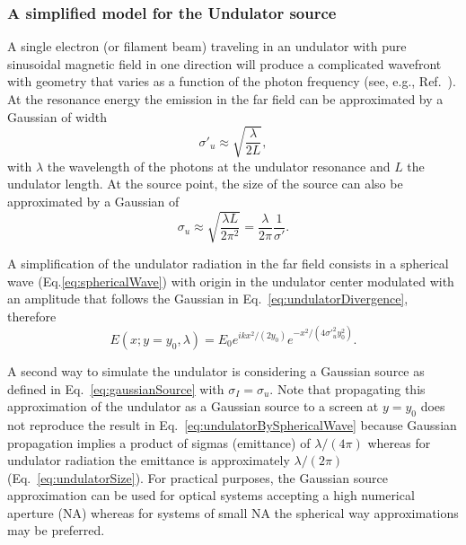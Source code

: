 \documentclass[preprint]{iucr}              %
\begin{document}
\subsubsection{A simplified model for the Undulator source}
\label{sec:undulator}

A single electron (or filament beam) traveling in an undulator with pure sinusoidal magnetic field in one direction will produce a complicated wavefront with geometry that varies as a function of the photon frequency (see, e.g., Ref.~\cite{elleaume}). At the resonance energy the emission in the far field can be approximated by a Gaussian of width \cite{elleaume}
\begin{equation}
\label{eq:undulatorDivergence}
    \sigma'_u \approx\sqrt{\frac{\lambda}{2 L}},
\end{equation}
with $\lambda$ the wavelength of the photons at the undulator resonance and $L$ the undulator length. At the source point, the size of the source can also be approximated by a Gaussian of
\begin{equation}
\label{eq:undulatorSize}
    \sigma_u \approx\sqrt{\frac{\lambda L}{2 \pi^2}} = \frac{\lambda}{2 \pi} \frac{1}{\sigma'}.
\end{equation}

A  simplification of the undulator radiation in the far field consists in a spherical wave (Eq.\ref{eq:sphericalWave}) with origin in the undulator center modulated with an amplitude that follows the Gaussian in Eq.~\ref{eq:undulatorDivergence}, therefore
\begin{equation}
    \label{eq:undulatorBySphericalWave}
    E(x;y=y_0,\lambda) = E_0 e^{i k x^2 / (2 y_0)} e^{-x^2/(4 \sigma'_u^2 y_0^2)}.
\end{equation}

A second way to simulate the undulator is considering a Gaussian source as defined in Eq.~\ref{eq:gaussianSource} with $\sigma_I=\sigma_u$. Note that propagating this approximation of the undulator as a Gaussian source to a screen at $y=y_0$ does not reproduce the result in Eq.~\ref{eq:undulatorBySphericalWave} because Gaussian propagation implies a product of sigmas (emittance) of $\lambda / (4 \pi)$ whereas for undulator radiation the emittance is approximately $\lambda / (2 \pi)$ (Eq.~\ref{eq:undulatorSize}). For practical purposes, the Gaussian source approximation can be used for optical systems accepting a high numerical aperture (NA) whereas for systems of small NA the spherical way approximations may be preferred.
\end{document}
